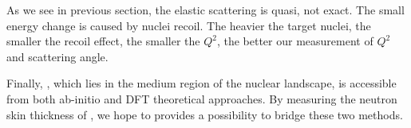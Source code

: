 As we see in previous section, the elastic scattering is quasi, not exact. The
small energy change is caused by nuclei recoil. The heavier the target nuclei,
the smaller the recoil effect, the smaller the $Q^2$, the better our measurement
of $Q^2$ and scattering angle.

Finally, \Ca, which lies in the medium region of the nuclear landscape, is 
accessible from both ab-initio and DFT theoretical approaches. 
By measuring the neutron skin thickness of \Ca, we hope to 
provides a possibility to bridge these two methods. 
